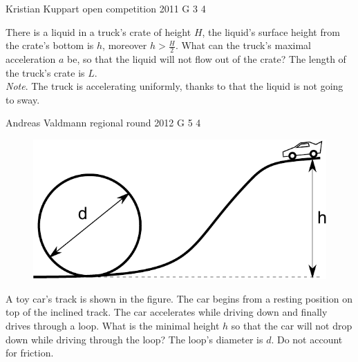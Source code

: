 \documentclass[11pt]{article}
\begin{document}
{Kristian Kuppart} %
{open competition} %
{2011} %
{G 3} %
{4} %
{

\ifEngStatement
There is a liquid in a truck’s crate of height $H$, the liquid’s surface height from the crate’s bottom is $h$, moreover $h > \frac{H}{2}$. What can the truck’s maximal acceleration $a$ be, so that the liquid will not flow out of the crate? The length of the truck’s crate is $L$.\\
\emph{Note}. The truck is accelerating uniformly, thanks to that the liquid is not going to sway.
\fi
}

{Andreas Valdmann} %
{regional round} %
{2012} %
{G 5} %
{4} %
{

\ifEngStatement
\begin{figure}%
\includegraphics[width=\linewidth]{2012-v2g-05-silmus}%
\end{figure}
A toy car’s track is shown in the figure. The car begins from a resting position on top of the inclined track. The car accelerates while driving down and finally drives through a loop. What is the minimal height $h$ so that the car will not drop down while driving through the loop? The loop’s diameter is $d$. Do not account for friction.
\fi
}
\end{document}
